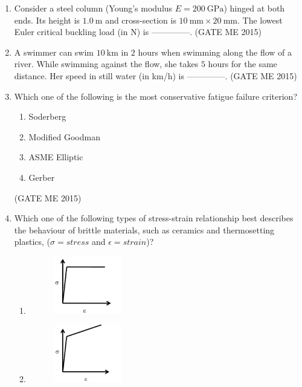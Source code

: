 \documentclass[journal]{IEEEtran}
\begin{document}
\begin{enumerate}
\item Consider a steel column (Young's modulus $E = 200\ \mathrm{GPa}$) hinged at both ends. Its height is $1.0\ \mathrm{m}$ and cross-section is $10\ \mathrm{mm}\times 20\ \mathrm{mm}$.  
The lowest Euler critical buckling load (in N) is --------------.
\hfill  (GATE ME 2015)

\item A swimmer can swim $10\ \mathrm{km}$ in $2$ hours when swimming along the flow of a river. While swimming against the flow, she takes $5$ hours for the same distance.  
Her speed in still water (in km/h) is --------------.
\hfill  (GATE ME 2015)

\item Which one of the following is the most conservative fatigue failure criterion?
\begin{multicols}{2}
\begin{enumerate}
    \item Soderberg
    \item Modified Goodman
    \item ASME Elliptic
    \item Gerber
\end{enumerate}
\end{multicols}
\hfill  (GATE ME 2015)

\item Which one of the following types of stress-strain relationship best describes the behaviour of brittle materials, such as ceramics and thermosetting plastics, ($\sigma = stress$ and $\epsilon = strain$)?

\begin{multicols}{2}
\begin{enumerate}

\item\begin{figure}[H]
    \centering
    \includegraphics[width=0.3\textwidth]{Fig 10.png}
    \caption{}
    \label{fig:question30}
\end{figure}

\item\begin{figure}[H]
    \centering
    \includegraphics[width=0.3\textwidth]{Fig 11.png}
    \caption{}
    \label{fig:question30}
\end{figure}


\end{enumerate}
\end{multicols}
\end{enumerate}
\end{document}
